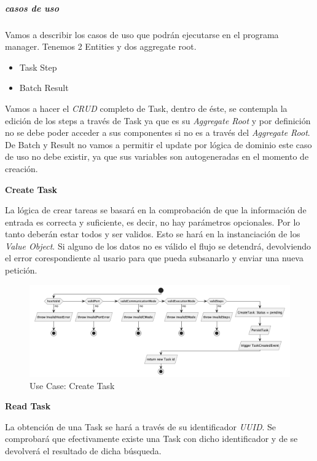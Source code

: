 \subparagraph{casos de uso}

Vamos a describir los casos de uso que podrán ejecutarse en el programa manager. Tenemos 2 Entities y dos aggregate root.

\begin{itemize}
    \item Task
    \subitem Step
    \item Batch
    \subitem Result
\end{itemize}

Vamos a hacer el \textit{CRUD} completo de Task, dentro de éste, se contempla la edición de los steps a través de Task ya que es su \textit{Aggregate Root} y por definición no se debe poder acceder a sus componentes si no es a través del \textit{Aggregate Root}. De Batch y Result no vamos a permitir el update por lógica de dominio este caso de uso no debe existir, ya que sus variables son autogeneradas en el momento de creación.

\textbf{Create Task}

La lógica de crear tareas se basará en la comprobación de que la información de entrada es correcta y suficiente, es decir, no hay parámetros opcionales. Por lo tanto deberán estar todos y ser validos. Esto se hará en la instanciación de los \textit{Value Object}. Si alguno de los datos no es válido el flujo se detendrá, devolviendo el error corespondiente al usario para que pueda subsanarlo y enviar una nueva petición.

\begin{figure}[H]
    \centering
    \includegraphics[height=0.2\textheight]{./part/Proyecto_ejecutivo/memoria_descriptiva/descripcionDelProyecto/manager/uml/createTaskUseCase}
    \caption{Use Case: Create Task}\label{fig:Use Case-Create Task}
\end{figure}

\textbf{Read Task}

La obtención de una Task se hará a través de su identificador \textit{UUID}. Se comprobará que efectivamente existe una Task con dicho identificador y de se devolverá el resultado de dicha búsqueda.

